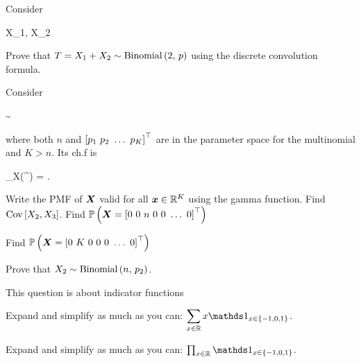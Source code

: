 \documentclass[12pt]{article}
\begin{document}
\eenum

\problem Consider

\beqn
X_1, X_2 \iid {}
\eeqn

\benum
{} Prove that $T = X_1 + X_2 \sim \mathrm{Binomial}\left(2,\,p\right)$ using the discrete convolution formula.
\eenum



\problem Consider

\beqn
\X \sim {}  
\eeqn

\noindent where both $n$ and $\left[p_1~p_2~\ldots~p_K\right]^\top$ are in the parameter space for the multinomial and $K > n$. Its ch.f is

\beqn
\phi_X(^\top) = .
\eeqn

\benum
{} Write the PMF of $\boldsymbol{X}$ valid for all $\boldsymbol{x} \in \mathbb{R}^K$ using the gamma function. 
 Find $\text{Cov}\left[X_2, X_3\right]$. 
 Find $\mathbb{P}\left(\boldsymbol{X} = \left[0~0~n~0~0~\ldots~0\right]^\top\right)$ 

 Find $\mathbb{P}\left(\boldsymbol{X} = \left[0~K~0~0~0~\ldots~0\right]^\top\right)$ 

 Prove that $X_2 \sim \mathrm{Binomial}\left(n,\,p_2\right)$. 

\eenum

\problem This question is about indicator functions

\benum
{} Expand and simplify as much as you can: $\displaystyle\sum_{x \in \reals} x\indic{x \in \braces{-1, 0, 1}}$. 

 Expand and simplify as much as you can: $\prod_{x \in \reals} \indic{x \in \braces{-1, 0, 1}}$. 
\end{document}
